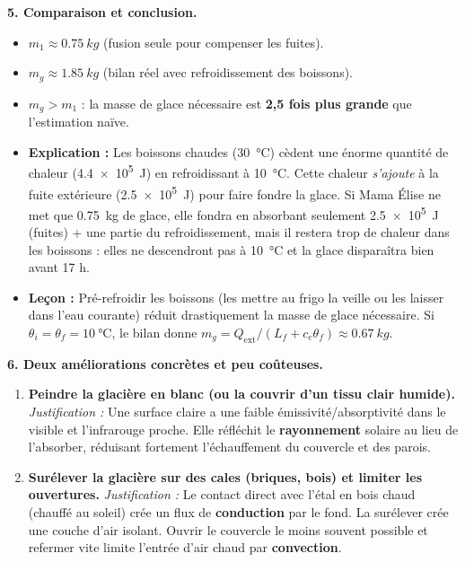 \documentclass[11pt]{article}
\begin{document}
\begin{exoresolu}
\textbf{5. Comparaison et conclusion.}
\begin{itemize}
\item $m_1 \approx \SI{0,75}{kg}$ (fusion seule pour compenser les fuites).
\item $m_g \approx \SI{1,85}{kg}$ (bilan réel avec refroidissement des boissons).
\item $m_g > m_1$ : la masse de glace nécessaire est \textbf{2,5 fois plus grande} que l'estimation naïve.
\item \textbf{Explication :} Les boissons chaudes (\SI{30}{\celsius}) cèdent une énorme quantité de chaleur (\SI{4,4e5}{J}) en refroidissant à \SI{10}{\celsius}. Cette chaleur \emph{s'ajoute} à la fuite extérieure (\SI{2,5e5}{J}) pour faire fondre la glace. Si Mama Élise ne met que \SI{0,75}{kg} de glace, elle fondra en absorbant seulement \SI{2,5e5}{J} (fuites) + une partie du refroidissement, mais il restera trop de chaleur dans les boissons : elles ne descendront pas à \SI{10}{\celsius} et la glace disparaîtra bien avant 17 h.
\item \textbf{Leçon :} Pré-refroidir les boissons (les mettre au frigo la veille ou les laisser dans l'eau courante) réduit drastiquement la masse de glace nécessaire. Si $\theta_i = \theta_f = \SI{10}{\celsius}$, le bilan donne $m_g = Q_{\text{ext}} / (L_f + c_e\theta_f) \approx \SI{0,67}{kg}$.
\end{itemize}

\textbf{6. Deux améliorations concrètes et peu coûteuses.}
\begin{enumerate}
\item \textbf{Peindre la glacière en blanc (ou la couvrir d'un tissu clair humide).} \emph{Justification :} Une surface claire a une faible émissivité/absorptivité dans le visible et l'infrarouge proche. Elle réfléchit le \textbf{rayonnement} solaire au lieu de l'absorber, réduisant fortement l'échauffement du couvercle et des parois.
\item \textbf{Surélever la glacière sur des cales (briques, bois) et limiter les ouvertures.} \emph{Justification :} Le contact direct avec l'étal en bois chaud (chauffé au soleil) crée un flux de \textbf{conduction} par le fond. La surélever crée une couche d'air isolant. Ouvrir le couvercle le moins souvent possible et refermer vite limite l'entrée d'air chaud par \textbf{convection}.
\end{enumerate}
\end{exoresolu}
\end{document}
